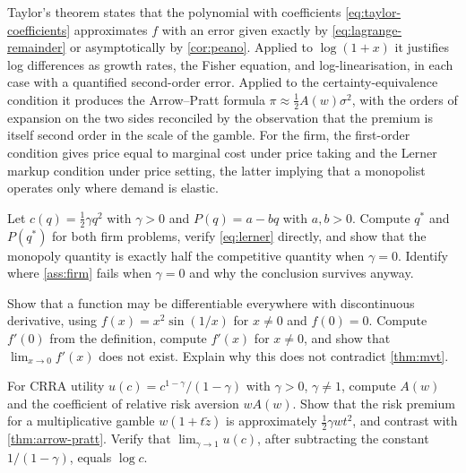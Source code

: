 Taylor's theorem states that the polynomial with coefficients
\eqref{eq:taylor-coefficients} approximates $f$ with an error given exactly by
\eqref{eq:lagrange-remainder} or asymptotically by
\autoref{cor:peano}. Applied to $\log(1+x)$ it justifies log differences as
growth rates, the Fisher equation, and log-linearisation, in each case with a
quantified second-order error. Applied to the certainty-equivalence condition it
produces the Arrow--Pratt formula $\pi\approx\tfrac12A(w)\sigma^2$, with the
orders of expansion on the two sides reconciled by the observation that the
premium is itself second order in the scale of the gamble. For the firm, the
first-order condition gives price equal to marginal cost under price taking and
the Lerner markup condition under price setting, the latter implying that a
monopolist operates only where demand is elastic.

\begin{exercise}\label{ex:c1-1}
	Let $c(q)=\tfrac12\gamma q^2$ with $\gamma>0$ and $P(q)=a-bq$ with
	$a,b>0$. Compute $q^\ast$ and $P(q^\ast)$ for both firm problems, verify
	\eqref{eq:lerner} directly, and show that the monopoly quantity is exactly half
	the competitive quantity when $\gamma=0$. Identify where
	\autoref{ass:firm} fails when $\gamma=0$ and why the conclusion survives anyway.
\end{exercise}

\begin{exercise}\label{ex:c1-2}
	Show that a function may be differentiable everywhere with discontinuous
	derivative, using $f(x)=x^2\sin(1/x)$ for $x\neq0$ and $f(0)=0$. Compute
	$f'(0)$ from the definition, compute $f'(x)$ for $x\neq0$, and show that
	$\lim_{x\to0}f'(x)$ does not exist. Explain why this does not contradict
	\autoref{thm:mvt}.
\end{exercise}

\begin{exercise}\label{ex:c1-3}
	For CRRA utility $u(c)=c^{1-\gamma}/(1-\gamma)$ with $\gamma>0$, $\gamma\neq1$,
	compute $A(w)$ and the coefficient of relative risk aversion $wA(w)$. Show that
	the risk premium for a multiplicative gamble $w(1+t\tilde z)$ is approximately
	$\tfrac12\gamma wt^2$, and contrast with \autoref{thm:arrow-pratt}. Verify that
	$\lim_{\gamma\to1}u(c)$, after subtracting the constant $1/(1-\gamma)$, equals
	$\log c$.
\end{exercise}
